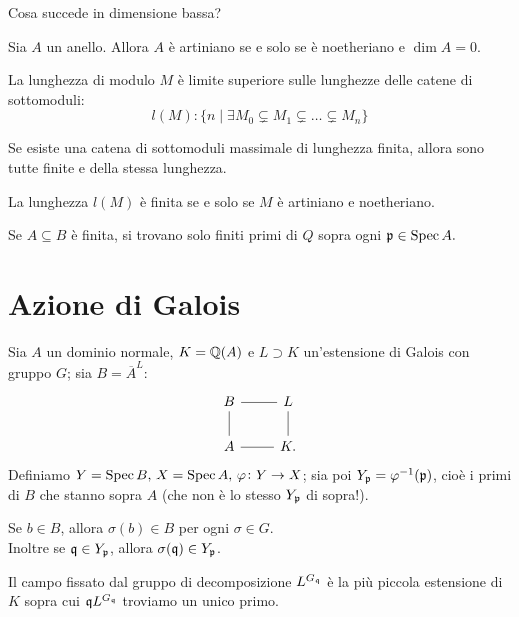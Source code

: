 Cosa succede in dimensione bassa?

\begin{theorem}
    Sia $A$ un anello. Allora $A$ è artiniano se e solo se è noetheriano e $\dim A=0$.
\end{theorem}

\begin{definition}[Lunghezza]
	La lunghezza di modulo $ M $ è limite superiore sulle lunghezze delle catene di sottomoduli:
	\[ l(M) \colon \{ n \mid \exists  M_0 \subsetneq M_1 \subsetneq \dots \subsetneq M_n \} \]
\end{definition}

\begin{proposition}
	Se esiste una catena di sottomoduli massimale di lunghezza finita, allora sono tutte finite e della stessa lunghezza.
\end{proposition}

\begin{proposition}
	La lunghezza $ l(M) $ è finita se e solo se $ M $ è artiniano e noetheriano.
\end{proposition}

\begin{theorem}
	Se $ A \subseteq B $ è finita, si trovano solo finiti primi di $ Q $ sopra ogni $ \mathfrak{p} \in \operatorname{Spec} A. $
\end{theorem}

\section{Azione di Galois}
Sia $A$ un dominio normale, $K=\mathbb{Q}(A)$ e $L\supset K$ un'estensione di Galois con gruppo $G$; sia $B=\overline{A}^L$:
\[ \begin{tikzcd}
B \rar[dash]\dar[dash] & L \dar[dash] \\
A \rar[dash] & K.
\end{tikzcd} \]
Definiamo $Y=\operatorname{Spec} B,\, X=\operatorname{Spec} A,\, \varphi\colon Y\to X$; sia poi $Y_{\mathfrak{p}}=\varphi^{-1}(\mathfrak{p})$, cioè i primi di $B$ che stanno sopra $A$ (che non è lo stesso $ Y_{\mathfrak{p}} $ di sopra!).

\begin{oss}
    Se $b\in B$, allora $\sigma(b)\in B$ per ogni $\sigma\in G$.\\
    Inoltre se $\mathfrak{q}\in Y_{\mathfrak{p}}$, allora $\sigma(\mathfrak{q})\in Y_{\mathfrak{p}}$.
\end{oss}

\begin{theorem}
	Il campo fissato dal gruppo di decomposizione $ L^{G_{\mathfrak{q}}} $ è la più piccola estensione di $ K $ sopra cui $ \mathfrak{q} L^{G_{\mathfrak{q}}} $ troviamo un unico primo.
\end{theorem}


